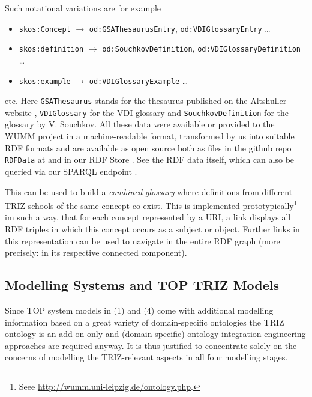 \documentclass[11pt,a4paper]{article}
\begin{document}
Such notational variations are for example
\begin{itemize}[noitemsep]
\item \texttt{skos:Concept} $\to$ \texttt{od:GSAThesaurusEntry},
  \texttt{od:VDIGlossaryEntry} \ldots
\item \texttt{skos:definition} $\to$ \texttt{od:SouchkovDefinition},
  \texttt{od:VDIGlossaryDefinition} \ldots
\item \texttt{skos:example} $\to$ \texttt{od:VDIGlossaryExample} \ldots
\end{itemize}
etc.  Here \texttt{GSAThesaurus} stands for the thesaurus published on the
Altshuller website \cite{GSA}, \texttt{VDIGlossary} for the VDI glossary
\cite{VDI} and \texttt{SouchkovDefinition} for the glossary
\cite{Souchkov2018} by V. Souchkov. All these data were available or provided
to the WUMM project in a machine-readable format, transformed by us into
suitable RDF formats and are available as open source both as files in the
github repo \texttt{RDFData} at \cite{WUMM-github} and in our RDF Store
\cite{WUMM-store}. See the RDF data itself, which can also be queried via our
SPARQL endpoint \cite{WUMM-sparql}.

This can be used to build a \emph{combined glossary} where definitions from
different TRIZ schools of the same concept co-exist. This is implemented
prototypically\footnote{Seee \url{http://wumm.uni-leipzig.de/ontology.php}.}
im such a way, that for each concept represented by a URI, a link displays all
RDF triples in which this concept occurs as a subject or object. Further links
in this representation can be used to navigate in the entire RDF graph (more
precisely: in its respective connected component).

\subsection{Modelling Systems and TOP TRIZ Models}

Since TOP system models in (1) and (4) come with additional modelling
information based on a great variety of domain-specific ontologies the TRIZ
ontology is an add-on only and (domain-specific) ontology integration
engineering approaches are required anyway. It is thus justified to
concentrate solely on the concerns of modelling the TRIZ-relevant aspects in
all four modelling stages.
\end{document}
